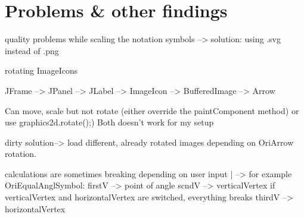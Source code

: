 
\section{Problems \& other findings}
\label{sec:problems}


quality problems while scaling the notation symbols --> solution: using .svg instead of .png

rotating ImageIcons

JFrame --> JPanel --> JLabel --> ImageIcon --> BufferedImage --> Arrow

Can move, scale but not rotate (either override the paintComponent method) or use graphics2d.rotate();)
Both doesn't work for my setup

dirty solution--> load different, already rotated images depending on OriArrow rotation.




calculations are sometimes breaking depending on user input
|
--> for example OriEqualAnglSymbol: 	firstV	--> point of angle
						scndV	--> verticalVertex			if verticalVertex and horizontalVertex are switched, everything breaks
						thirdV --> horizontalVertex
						
						
